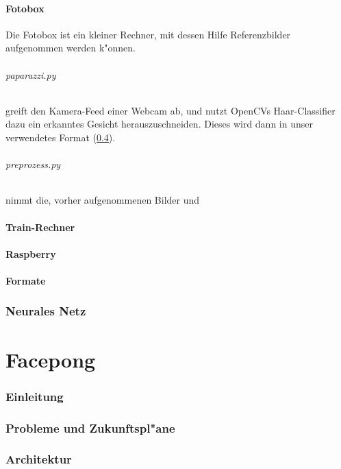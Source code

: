 \documentclass[12pt]{article}
\begin{document}
\subsection{Fotobox}
Die Fotobox ist ein kleiner Rechner,
mit dessen Hilfe Referenzbilder aufgenommen werden
k"onnen.
\paragraph{paparazzi.py}
greift den Kamera-Feed einer Webcam ab, und nutzt
OpenCVs Haar-Classifier dazu ein erkanntes Gesicht 
herauszuschneiden. Dieses wird dann in unser verwendetes
Format (\ref{formats}).
\paragraph{preprozess.py}
nimmt die, vorher aufgenommenen Bilder und 
\subsection{Train-Rechner}
\subsection{Raspberry}
\subsection{Formate}
\label{formats}

\section{Neurales Netz}


\part{Facepong}
\section{Einleitung}
\section{Probleme und Zukunftspl"ane}
\section{Architektur}
\end{document}
